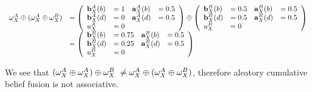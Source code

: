 \documentclass[a4paper,12pt]{article}
\theoremstyle{definition}
\theoremstyle{theorem}
\numberwithin{equation}{section}
\begin{document}
\begin{equation}
\begin{array} {rl}
\omega^{A}_{X} \oplus (\omega^{A}_{X} \oplus \omega^{B}_{X}) & = \left(
\begin{array}{llll}
\mathbf{b}^{A}_{X}(b) & = 1 & \mathbf{a}^{A}_{X}(b) & = 0.5 \\
\mathbf{b}^{A}_{X}(d) & = 0 & \mathbf{a}^{A}_{X}(d) & = 0.5 \\
u^A_X & = 0
\end{array} \right) \oplus \left(
\begin{array}{llll}
\mathbf{b}^{B}_{X}(b) & = 0.5 & \mathbf{a}^{B}_{X}(b) & = 0.5 \\
\mathbf{b}^{B}_{X}(d) & = 0.5 & \mathbf{a}^{B}_{X}(d) & = 0.5 \\
u^B_X & = 0
\end{array} \right) \\
& = \left(
\begin{array}{llll}
\mathbf{b}^{B}_{X}(b) & = 0.75 & \mathbf{a}^{B}_{X}(b) & = 0.5 \\
\mathbf{b}^{B}_{X}(d) & = 0.25 & \mathbf{a}^{B}_{X}(d) & = 0.5 \\
u^B_X & = 0
\end{array} \right)
\end{array}
\end{equation}

We see that $(\omega^{A}_{X} \oplus \omega^{A}_{X}) \oplus \omega^{B}_{X}\ \neq \omega^{A}_{X} \oplus (\omega^{A}_{X} \oplus \omega^{B}_{X})$, therefore aleatory cumulative belief fusion is not associative.


\printbibliography
\end{document}
